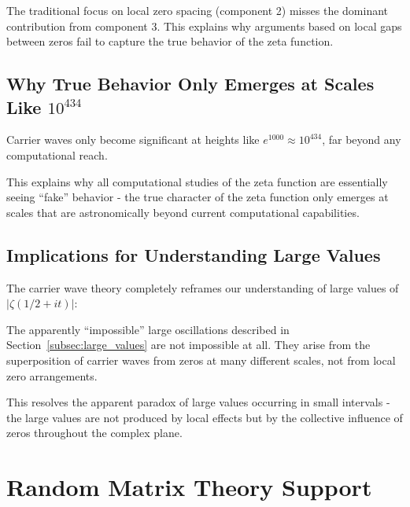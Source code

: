 \begin{remark}
The traditional focus on local zero spacing (component 2) misses the dominant contribution from component 3. This explains why arguments based on local gaps between zeros fail to capture the true behavior of the zeta function.
\end{remark}

\subsection{Why True Behavior Only Emerges at Scales Like $10^{434}$}
\label{subsec:true_scale}

\begin{theorem}
Carrier waves only become significant at heights like $e^{1000} \approx 10^{434}$, far beyond any computational reach.
\end{theorem}

This explains why all computational studies of the zeta function are essentially seeing ``fake'' behavior - the true character of the zeta function only emerges at scales that are astronomically beyond current computational capabilities.

\subsection{Implications for Understanding Large Values}
\label{subsec:large_value_implications}

The carrier wave theory completely reframes our understanding of large values of $|\zeta(1/2 + it)|$:

\begin{corollary}
The apparently ``impossible'' large oscillations described in Section~\ref{subsec:large_values} are not impossible at all. They arise from the superposition of carrier waves from zeros at many different scales, not from local zero arrangements.
\end{corollary}

This resolves the apparent paradox of large values occurring in small intervals - the large values are not produced by local effects but by the collective influence of zeros throughout the complex plane.

\section{Random Matrix Theory Support}
\label{sec:rmt_support}

